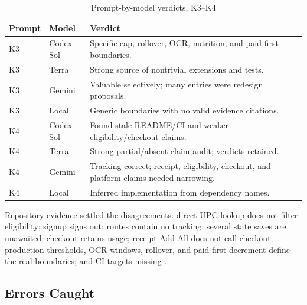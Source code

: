 \documentclass[sigconf]{acmart}
\begin{document}
\begin{table}[H]
  \caption{Prompt-by-model verdicts, K3--K4}
  \label{tab:model-comparison-2}
  \centering
  \scriptsize
  \begin{tabular}{@{}L{0.08\columnwidth}L{0.20\columnwidth}L{0.62\columnwidth}@{}}
    \toprule
    Prompt & Model & Verdict \\
    \midrule
    K3 & Codex Sol & Specific cap, rollover, OCR, nutrition, and paid-first boundaries. \\
    K3 & Terra & Strong source of nontrivial extensions and tests. \\
    K3 & Gemini & Valuable selectively; many entries were redesign proposals. \\
    K3 & Local & Generic boundaries with no valid evidence citations. \\
    K4 & Codex Sol & Found stale README/CI and weaker eligibility/checkout claims. \\
    K4 & Terra & Strong partial/absent claim audit; verdicts retained. \\
    K4 & Gemini & Tracking correct; receipt, eligibility, checkout, and platform claims needed narrowing. \\
    K4 & Local & Inferred implementation from dependency names. \\
    \bottomrule
  \end{tabular}
\end{table}

Repository evidence settled the disagreements: direct UPC lookup does not
filter eligibility; signup signs out; routes contain no tracking; several state
saves are unawaited; checkout retains usage; receipt Add All does not call
checkout; production thresholds, OCR windows, rollover, and paid-first
decrement define the real boundaries; and CI targets missing .

\subsection{Errors Caught}
\end{document}
